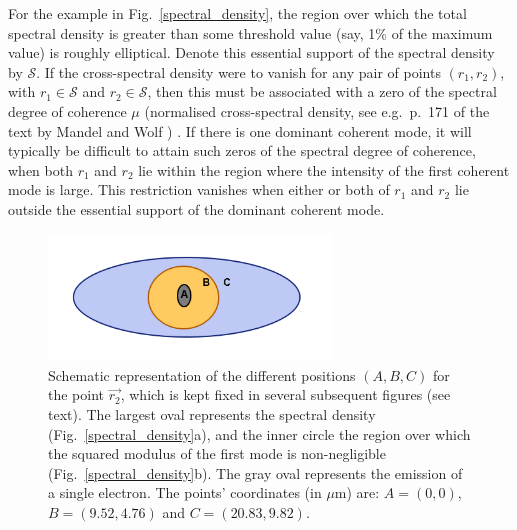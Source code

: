 \documentclass[%
 reprint,
 amsmath,amssymb,
 aps,
]{revtex4-1}
\begin{document}
For the example in Fig.~\ref{spectral_density}, the region over which the total spectral density is greater than some threshold value (say, 1\% of the maximum value) is roughly elliptical.  Denote this essential support of the spectral density by $\mathcal{S}$.  If the cross-spectral density were to vanish for any pair of points $(r_1,r_2)$, with $r_1 \in \mathcal{S}$ and $r_2 \in \mathcal{S}$, then this must be associated with a zero of the spectral degree of coherence $\mu$ (normalised cross-spectral density, see e.g.~p.~171 of the text by Mandel and Wolf \cite{mandel_wolf}) \cite{GburSPIE}. %
If there is one dominant coherent mode, it will typically be difficult to attain such zeros of the spectral degree of coherence, when both $r_1$ and $r_2$ lie within the region where the intensity of the first coherent mode is large.  This restriction vanishes when either or both of $r_1$ and $r_2$ lie outside the essential support of the dominant coherent mode.  

\begin{figure}
\includegraphics[trim=0 8mm 0 0,clip, width=7.5cm]{Figures/eye.png}
\caption{Schematic representation of the different positions $(A,B,C)$ for the point $\vec{r_2}$, which is kept fixed in several subsequent figures (see text). The largest oval represents the spectral density (Fig.~\ref{spectral_density}a), and the inner circle the region over which the squared modulus of the first mode is non-negligible (Fig.~\ref{spectral_density}b). The gray oval represents the emission of a single electron. 
The points' coordinates (in $\mu$m) are: $A=(0,0)$, $B=(9.52,4.76)$ and $C=(20.83,9.82)$.}
\label{eye}
\end{figure}
\end{document}
